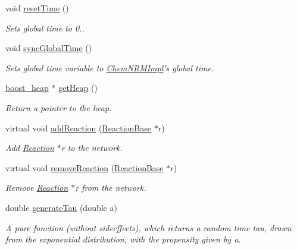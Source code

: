 \begin{DoxyCompactItemize}
void \hyperlink{classchem_1_1ChemNRMImpl_abc38c43b16a4ab1aa31505152e4426ed}{reset\-Time} ()
\begin{DoxyCompactList}\small\item\em Sets global time to 0.. \end{DoxyCompactList}\item 
void \hyperlink{classchem_1_1ChemNRMImpl_ad096a21196bb3e5a978dc3fdb50d8e1b}{sync\-Global\-Time} ()
\begin{DoxyCompactList}\small\item\em Sets global time variable to \hyperlink{classchem_1_1ChemNRMImpl}{Chem\-N\-R\-M\-Impl}'s global time. \end{DoxyCompactList}\item 
\hyperlink{namespacechem_aacd1d2bb93e0bb1b1af9bb1fbb5133ca}{boost\-\_\-heap} $\ast$ \hyperlink{classchem_1_1ChemNRMImpl_ae52572d35469dd8569457dbce96af78e}{get\-Heap} ()
\begin{DoxyCompactList}\small\item\em Return a pointer to the heap. \end{DoxyCompactList}\item 
virtual void \hyperlink{classchem_1_1ChemNRMImpl_afdd66d28d760064d5edc4472b8146a08}{add\-Reaction} (\hyperlink{classchem_1_1ReactionBase}{Reaction\-Base} $\ast$r)
\begin{DoxyCompactList}\small\item\em Add \hyperlink{classchem_1_1Reaction}{Reaction} $\ast$r to the network. \end{DoxyCompactList}\item 
virtual void \hyperlink{classchem_1_1ChemNRMImpl_a529cafc541d6eb933a6c1bf5869e2d45}{remove\-Reaction} (\hyperlink{classchem_1_1ReactionBase}{Reaction\-Base} $\ast$r)
\begin{DoxyCompactList}\small\item\em Remove \hyperlink{classchem_1_1Reaction}{Reaction} $\ast$r from the network. \end{DoxyCompactList}\item 
double \hyperlink{classchem_1_1ChemNRMImpl_a196f525d2e2392c0531f763fd8169701}{generate\-Tau} (double a)
\begin{DoxyCompactList}\small\item\em A pure function (without sideeffects), which returns a random time tau, drawn from the exponential distribution, with the propensity given by a. \end{DoxyCompactList}\item 

\end{DoxyCompactItemize}
